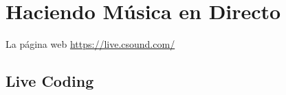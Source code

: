 
\chapter{Haciendo Música en Directo}

La página web \url{https://live.csound.com/ }

\section{Live Coding}
